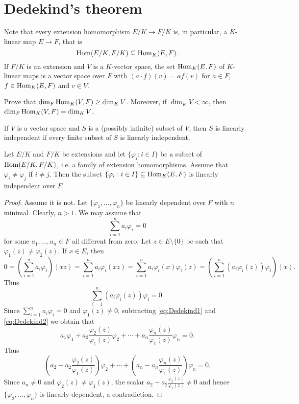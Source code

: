 \section{Dedekind's theorem}

Note that every extension homomorphism $E/K\to F/K$ is, in particular, 
a $K$-linear map $E\to F$, that is
\[
\operatorname{Hom}(E/K,F/K)\subseteq\operatorname{Hom}_K(E,F).
\]
If $F/K$ is an extension and $V$ 
is a $K$-vector space, the set
$\operatorname{Hom}_K(E,F)$ of $K$-linear maps
is a vector space over $F$ with
$(a\cdot f)(v)=af(v)$ for $a\in F$, $f\in\operatorname{Hom}_K(E,F)$ and $v\in V$. 

\begin{exercise}
\label{xca:dim}
    Prove that $\dim_F\operatorname{Hom}_K(V,F)\geq\dim_KV$. Moreover, if 
     $\dim_KV<\infty$, then $\dim_F\operatorname{Hom}_K(V,F)=\dim_KV$.
\end{exercise}

If $V$ is a vector space and $S$ is a (possibly infinite) subset of $V$, 
then $S$ is linearly independent if every finite subset of $S$ is linearly independent. 

\begin{theorem}[Dedekind]
Let $E/K$ and $F/K$ be extensions and let 
$\{\varphi_i:i\in I\}$ 
be a subset of
$\operatorname{Hom}(E/K,F/K)$, i.e. a 
family of extension homomorphisms. Assume that 
$\varphi_i\ne \varphi_j$ if $i\ne j$. Then 
the subset $\{\varphi_i:i\in I\}\subseteq\operatorname{Hom}_K(E,F)$ 
is linearly independent over $F$. 
\end{theorem}

\begin{proof}
    Assume it is not. Let $\{\varphi_1,\dots,\varphi_n\}$ 
    be linearly dependent over $F$ with $n$ minimal. Clearly, $n>1$. 
    We may assume that 
    \begin{equation}
        \label{eq:Dedekind1}
        \sum_{i=1}^n a_i\varphi_i=0
    \end{equation}
    for some $a_1,\dots,a_n\in F$ all different from zero. 
    Let
    $z\in E\setminus\{0\}$ be such that $\varphi_1(z)\ne\varphi_2(z)$. If $x\in E$, then
    \[
    0=\left(\sum_{i=1}^na_i\varphi_i\right)(xz)=\sum_{i=1}^na_i\varphi_i(xz)
    =\sum_{i=1}^na_i\varphi_i(x)\varphi_i(z)
    =\left(\sum_{i=1}^n (a_i\varphi_i(z))\varphi_i\right)(x).
    \]
    Thus 
    \begin{equation}
        \label{eq:Dedekind2}
        \sum_{i=1}^n (a_i\varphi_i(z))\varphi_i=0.
    \end{equation}
    Since $\sum_{i=1}^na_i\varphi_i=0$ and $\varphi_1(z)\ne0$, 
    subtracting \eqref{eq:Dedekind1} and \eqref{eq:Dedekind2} we obtain that  
    \[
    a_1\varphi_1+a_2\frac{\varphi_2(z)}{\varphi_1(z)}\varphi_2+\cdots+a_n\frac{\varphi_n(z)}{\varphi_1(z)}\varphi_n=0.
    \]
    Thus
    \[
    \left(a_2-a_2\frac{\varphi_2(z)}{\varphi_1(z)}\right)\varphi_2
    +\cdots+\left(a_n-a_n\frac{\varphi_n(z)}{\varphi_1(z)}\right)\varphi_n=0.
    \]
    Since $a_n\ne 0$ and $\varphi_2(z)\ne\varphi_1(z)$, 
    the scalar $a_2-a_2\frac{\varphi_2(z)}{\varphi_1(z)}\ne 0$ and hence 
    $\{\varphi_2,\dots,\varphi_n\}$ is linearly dependent, a contradiction. 
\end{proof}

